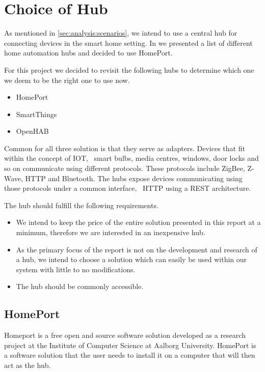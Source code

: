 \section{Choice of Hub}
\label{sec:analysis:choice-of-hub}

As mentioned in \cref{sec:analysis:scenarios}, we intend to use a central hub for connecting devices in the smart home setting. In \cite{prespecialisation} we presented a list of different home automation hubs and decided to use HomePort.

For this project we decided to revisit the following hubs to determine which one we deem to be the right one to use now.

\begin{itemize}
    \item HomePort
    \item SmartThings
    \item OpenHAB
\end{itemize}

Common for all three solution is that they serve as adapters. Devices that fit within the concept of IOT, \eg~smart bulbs, media centres, windows, door locks and so on communicate using different protocols. These protocols include ZigBee, Z-Wave, HTTP and Bluetooth. The hubs expose devices communicating using those protocols under a common interface, \eg~HTTP using a REST architecture.

The hub should fulfill the following requirements.

\begin{itemize}
\item We intend to keep the price of the entire solution presented in this report at a minimum, therefore we are interested in an inexpensive hub.
\item As the primary focus of the report is not on the development and research of a hub, we intend to choose a solution which can easily be used within our system with little to no modifications.
\item The hub should be commonly accessible.
\end{itemize}

\subsection{HomePort}
\label{sec:analysis:choice-of-hub:homeport}

Homeport \cite{HOMEPORT10,homeport:github} is a free open and source software solution developed as a research project at the Institute of Computer Science at Aalborg University.
HomePort is a software solution that the user needs to install it on a computer that will then act as the hub.

